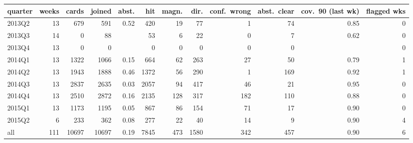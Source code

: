 \begin{tabular}{lrrrrrrrrrrr}
\toprule
quarter & weeks & cards & joined & abst. & hit & magn. & dir. & conf.\ wrong & abst.\ clear & cov.\ 90 (last wk) & flagged wks \\
\midrule
2013Q2 & 13 & 679 & 591 & 0.52 & 420 & 19 & 77 & 1 & 74 & 0.85 & 0 \\
2013Q3 & 14 & 0 & 88 &  & 53 & 6 & 22 & 0 & 7 & 0.62 & 0 \\
2013Q4 & 13 & 0 & 0 &  & 0 & 0 & 0 & 0 & 0 &  & 0 \\
2014Q1 & 13 & 1322 & 1066 & 0.15 & 664 & 62 & 263 & 27 & 50 & 0.79 & 1 \\
2014Q2 & 13 & 1943 & 1888 & 0.46 & 1372 & 56 & 290 & 1 & 169 & 0.92 & 1 \\
2014Q3 & 13 & 2837 & 2635 & 0.03 & 2057 & 94 & 417 & 46 & 21 & 0.95 & 0 \\
2014Q4 & 13 & 2510 & 2872 & 0.16 & 2135 & 128 & 317 & 182 & 110 & 0.88 & 0 \\
2015Q1 & 13 & 1173 & 1195 & 0.05 & 867 & 86 & 154 & 71 & 17 & 0.90 & 0 \\
2015Q2 & 6 & 233 & 362 & 0.08 & 277 & 22 & 40 & 14 & 9 & 0.90 & 4 \\
\midrule
all & 111 & 10697 & 10697 & 0.19 & 7845 & 473 & 1580 & 342 & 457 & 0.90 & 6 \\
\bottomrule
\end{tabular}
